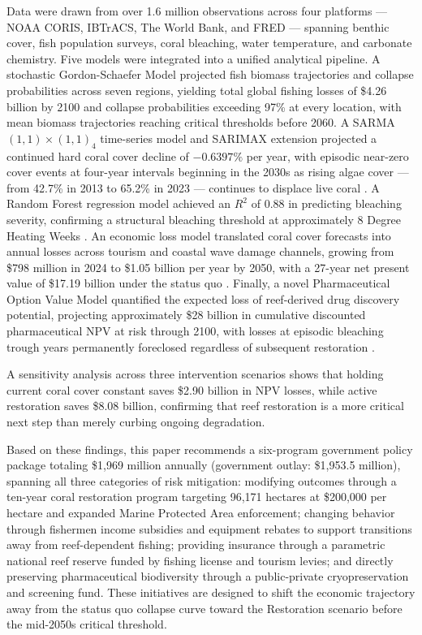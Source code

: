 \documentclass[10pt,letterpaper]{article}
\newcounter{gs}
\begin{document}
Data were drawn from over 1.6 million observations across four platforms --- NOAA CORIS, IBTrACS, The World Bank, and FRED \cite{noaa_coris, ibtracs, world_bank, fred} --- spanning benthic cover, fish population surveys, coral bleaching, water temperature, and carbonate chemistry. Five models were integrated into a unified analytical pipeline. A stochastic Gordon-Schaefer Model projected fish biomass trajectories and collapse probabilities across seven regions, yielding total global fishing losses of \$4.26 billion by 2100 and collapse probabilities exceeding 97\% at every location, with mean biomass trajectories reaching critical thresholds before 2060. A SARMA$(1,1)\times(1,1)_4$ time-series model and SARIMAX extension projected a continued hard coral cover decline of $-0.6397\%$ per year, with episodic near-zero cover events at four-year intervals beginning in the 2030s as rising algae cover --- from 42.7\% in 2013 to 65.2\% in 2023 --- continues to displace live coral \cite{bellwood2004}. A Random Forest regression model achieved an $R^2$ of 0.88 in predicting bleaching severity, confirming a structural bleaching threshold at approximately 8 Degree Heating Weeks \cite{noaa_crw}. An economic loss model translated coral cover forecasts into annual losses across tourism and coastal wave damage channels, growing from \$798 million in 2024 to \$1.05 billion per year by 2050, with a 27-year net present value of \$17.19 billion under the status quo \cite{storlazzi_2019, ferrario_2014, spalding_tourism_2017}. Finally, a novel Pharmaceutical Option Value Model quantified the expected loss of reef-derived drug discovery potential, projecting approximately \$28 billion in cumulative discounted pharmaceutical NPV at risk through 2100, with losses at episodic bleaching trough years permanently foreclosed regardless of subsequent restoration \cite{simpson1996, costello2006, newman2016}.

A sensitivity analysis across three intervention scenarios shows that holding current coral cover constant saves \$2.90 billion in NPV losses, while active restoration saves \$8.08 billion, confirming that reef restoration is a more critical next step than merely curbing ongoing degradation.

Based on these findings, this paper recommends a six-program government policy package totaling \$1,969 million annually (government outlay: \$1,953.5 million), spanning all three categories of risk mitigation: modifying outcomes through a ten-year coral restoration program targeting 96,171 hectares at \$200,000 per hectare and expanded Marine Protected Area enforcement; changing behavior through fishermen income subsidies and equipment rebates to support transitions away from reef-dependent fishing; providing insurance through a parametric national reef reserve funded by fishing license and tourism levies; and directly preserving pharmaceutical biodiversity through a public-private cryopreservation and screening fund. These initiatives are designed to shift the economic trajectory away from the status quo collapse curve toward the Restoration scenario before the mid-2050s critical threshold.
\end{document}
